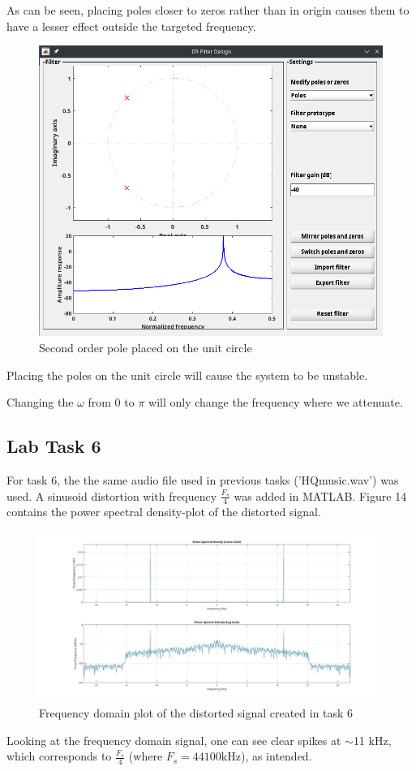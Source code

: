 \documentclass[a4paper,11pt]{article}
\begin{document}
As can be seen, placing poles closer to zeros rather than in origin causes them to have a lesser effect outside the targeted frequency.  
\begin{figure}[H]
    \centering
    \includegraphics[scale=0.6]{./images/2ndorder-pole.png}
    \caption{Second order pole placed on the unit circle}
    \label{fig:my_label}
\end{figure}

Placing the poles on the unit circle will cause the system to be unstable.

Changing the $\omega$ from 0 to $\pi$ will only change the frequency where we attenuate. 
\subsection{Lab Task 6}
For task 6, the the same audio file used in previous tasks ('HQmusic.wav') was used. A sinusoid distortion with frequency $\frac{F_s}{4}$ was added in MATLAB. Figure 14 contains the power spectral density-plot of the distorted signal.
\begin{figure}[H]
    \hspace{-50pt}\includegraphics[scale=0.28]{./images/Task6-FFT.jpg}
    \caption{Frequency domain plot of the distorted signal created in task 6}
    \label{fig:my_label}
\end{figure}
Looking at the frequency domain signal, one can see clear spikes at $\sim$11 kHz, which corresponds to $\frac{F_s}{4}$ (where $F_s = 44100$kHz), as intended.
\end{document}
